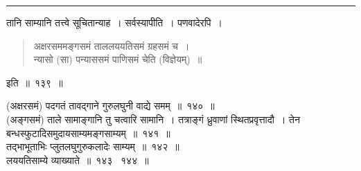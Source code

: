 \documentclass[11pt, openany]{book}
\begin{document}
\hrule

\vspace{2mm}
तानि साम्यानि तत्त्वे सूचितान्याह~। सर्वस्यापीति~। {\qtt पणवादेरपि}~।

\begin{quote}
{\qt अक्षरसममङ्गसमं ताललययतिसमं ग्रहसमं च~।\\
 न्यासो (सा) पन्याससमं पाणिसमं चेति (विज्ञेयम्)~॥}
\end{quote}
 
\vspace{-5mm}
\begin{flushright}
इति~॥~१३९~॥
\end{flushright}
 
(अक्षरसमं) पदगतं तावद्गाने गुरुलघुनी वाद्ये समम्~॥~१४०~॥\\

(अङ्गसमं) ताले सामाङ्गानि तु चत्वारि सामानि~। तत्राङ्गं ध्रुवाणां स्थितप्रवृत्तादौ~। तेन बन्धस्फुटादिसमुदायसाम्यमङ्गसाम्यम्~॥~१४१~॥\\

तद्भाभूताभिः प्लुतलघुगुरुकलादेः साम्यम्~॥~१४२~॥\\

लययतिसाम्ये व्याख्याते~॥~१४३ \textendash\ १४४~॥

\newpage
\end{document}
